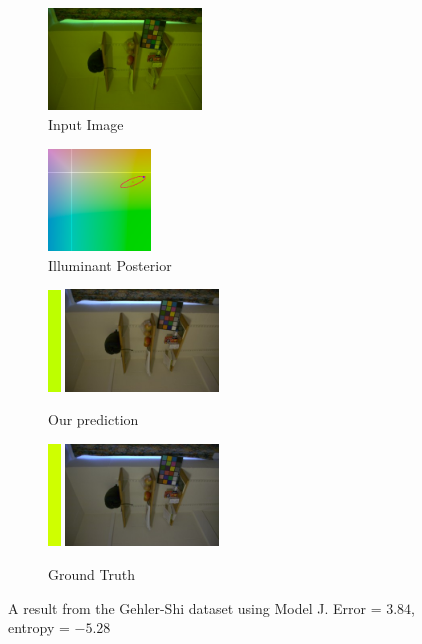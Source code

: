 \documentclass[10pt,twocolumn,letterpaper]{article}
\begin{document}
\begin{figure}[!]
\centering
  \begin{subfigure}[!]{1.7in}
    \includegraphics[width=1.6in]{figures/results/gehlershi/00000524_input.jpg}
    \caption{\footnotesize Input Image}
  \end{subfigure}
  \begin{subfigure}[!]{1.17in}
    \includegraphics[width=1.07in]{figures/results/gehlershi/00000524_chroma.png}
    \caption{\footnotesize Illuminant Posterior}
  \end{subfigure}
\begin{subfigure}[!]{1.9in}
    \includegraphics[width=0.133in]{figures/results/gehlershi/00000524_illum.png}\!
    \includegraphics[width=1.6in]{figures/results/gehlershi/00000524_prediction.jpg}
    \caption{\footnotesize Our prediction}
  \end{subfigure}
  \begin{subfigure}[!]{1.9in}
    \includegraphics[width=0.133in]{figures/results/gehlershi/00000524_illum_true.png}\!
    \includegraphics[width=1.6in]{figures/results/gehlershi/00000524_true.jpg}
    \caption{\footnotesize Ground Truth}
  \end{subfigure}
  \caption{
    A result from the Gehler-Shi dataset using Model J. Error = $3.84$\textdegree, entropy = $-5.28$
    \label{fig:results9}
  }
\end{figure}
\end{document}
